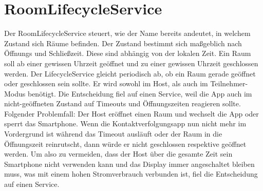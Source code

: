 \section{RoomLifecycleService}
\label{sec:RoomLifecycleService}
Der RoomLifecycleService steuert, wie der Name bereits andeutet, in welchem Zustand sich Räume befinden.
 Der Zustand bestimmt sich maßgeblich nach Öffnungs und Schließzeit.
Diese sind abhängig von der lokalen Zeit. Ein Raum soll ab einer gewissen Uhrzeit geöffnet und zu einer gewissen Uhrzeit geschlossen werden. 
Der LifecycleService gleicht periodisch ab, ob ein Raum gerade geöffnet oder geschlossen sein sollte.
Er wird sowohl im Host, als auch im Teilnehmer-Modus benötigt. 
Die Entscheidung fiel auf einen Service, weil die App auch im nicht-geöffneten Zustand auf Timeouts und Öffnungszeiten reagieren sollte.
Folgender Problemfall: Der Host eröffnet einen Raum und wechselt die App oder sperrt das Smartphone. 
Wenn die Kontaktverfolgungsapp nun nicht mehr im Vordergrund ist während das Timeout ausläuft oder der Raum in die Öffnungszeit reinrutscht, dann würde er nicht geschlossen respektive geöffnet werden. 
Um also zu vermeiden, dass der Host über die gesamte Zeit sein Smartphone nicht verwenden kann und das Display immer angeschaltet bleiben muss, was mit einem hohen Stromverbrauch verbunden ist, fiel die Entscheidung auf einen Service.

